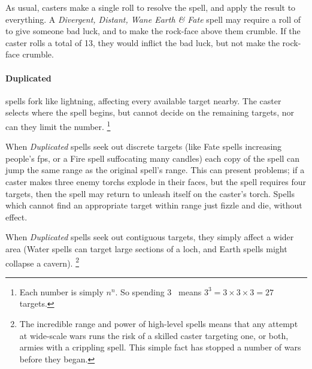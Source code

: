 \begin{multicols}{2}
As usual, casters make a single roll to resolve the spell, and apply the result to everything.
A \textit{Divergent, Distant, Wane Earth \& Fate} spell may require a roll of \tn[7] to give someone bad luck, and \tn[14] to make the rock-face above them crumble.
If the caster rolls a total of 13, they would inflict the bad luck, but not make the rock-face crumble.

\paragraph{Duplicated}
\label{duplicatedDesc}
spells fork like lightning, affecting every available target nearby.
The caster selects where the spell begins, but cannot decide on the remaining targets, nor can they limit the number.%
\footnote{Each number is simply $n^n$.  So spending 3~ means $3^3 = 3\times 3\times 3 = 27$ targets.}

When \textit{Duplicated} spells seek out discrete targets (like Fate spells increasing people's \glspl{fp}, or a Fire spell suffocating many candles) each copy of the spell can jump the same range as the original spell's range.
This can present problems; if a caster makes three enemy \glspl{torch} explode in their faces, but the spell requires four targets, then the spell may return to unleash itself on the caster's \gls{torch}.
Spells which cannot find an appropriate target within range just fizzle and die, without effect.

When \textit{Duplicated} spells seek out contiguous targets, they simply affect a wider area
(Water spells can target large sections of a loch, and Earth spells might collapse a cavern).%
\footnote{The incredible range and power of high-level spells means that any attempt at wide-scale wars runs the risk of a skilled caster targeting one, or both, armies with a crippling spell.
  This simple fact has stopped a number of wars before they began.

}
\end{multicols}
